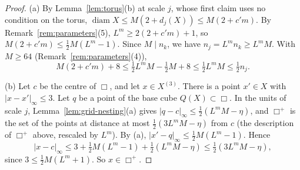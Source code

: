 \begin{proof}
(a) By Lemma~\ref{lem:torus}(b) at scale $j$, whose first claim uses no condition on the torus, $\operatorname{diam}X\le M(2+d_j(X))\le M(2+c'm)$. By Remark~\ref{rem:parameters}(5), $L^m\ge2(2+c'm)+1$, so $M(2+c'm)\le\frac12M(L^m-1)$. Since $M\mid n_k$, we have $n_j=L^mn_k\ge L^mM$. With $M\ge64$ (Remark~\ref{rem:parameters}(4)),
\[
M(2+c'm)+8\le\tfrac12L^mM-\tfrac12M+8\le\tfrac12L^mM\le\tfrac12n_j .
\]

(b) Let $c$ be the centre of $\Box$, and let $x\in X^{(3)}$. There is a point $x'\in X$ with $|x-x'|_\infty\le3$. Let $q$ be a point of the base cube $Q(X)\subset\Box$. In the units of scale $j$, Lemma~\ref{lem:grid-nesting}(a) gives $|q-c|_\infty\le\frac12(L^mM-\eta)$, and $\Box^+$ is the set of the points at distance at most $\frac12(3L^mM-\eta)$ from $c$ (the description of $\Box^+$ above, rescaled by $L^m$). By (a), $|x'-q|_\infty\le\frac12M(L^m-1)$. Hence
\[
|x-c|_\infty\le3+\tfrac12M(L^m-1)+\tfrac12(L^mM-\eta)\le\tfrac12(3L^mM-\eta),
\]
since $3\le\frac12M(L^m+1)$. So $x\in\Box^+$.
\end{proof}

